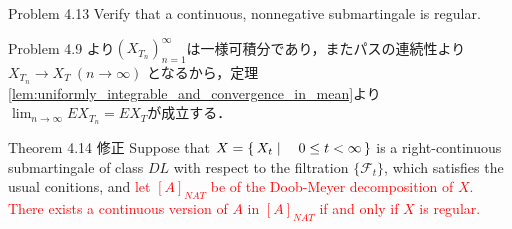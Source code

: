 	\begin{itembox}[l]{Problem 4.13}
		Verify that a continuous, nonnegative submartingale is regular. 
	\end{itembox}
	
	\begin{prf}
		Problem 4.9 より$(X_{T_n})_{n=1}^\infty$は一様可積分であり，またパスの連続性より
		$X_{T_n} \longrightarrow X_T\ (n \longrightarrow \infty)$
		となるから，定理\ref{lem:uniformly_integrable_and_convergence_in_mean}より
		$\lim_{n \to \infty} EX_{T_n} = EX_T$が成立する．
		\QED
	\end{prf}
	
	\begin{itembox}[l]{Theorem 4.14 修正}
		Suppose that $X = \left\{\, X_t \mid \quad 0 \leq t < \infty\, \right\}$ is a right-continuous submartingale
		of class $DL$ with respect to the filtration $\{\mathscr{F}_t\}$, which
		satisfies the usual conitions, and 
		\textcolor{red}{let $[A]_{NAT}$ be of the Doob-Meyer decomposition of $X$.
		There exists a continuous version of $A$ in $[A]_{NAT}$ if and only if $X$ is regular.}
	\end{itembox}
	
